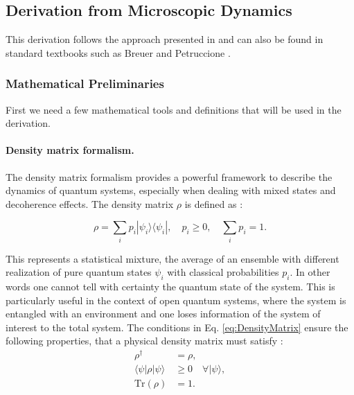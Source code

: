 \subsection{Derivation from Microscopic Dynamics}
\label{subsec:Derivation_redfield_eq}

\noindent
This derivation follows the approach presented in \cite{manzano2020shortintroductionlindblad} and can also be found in standard textbooks such as Breuer and Petruccione \cite{breuerpetruccione2009theoryopenquantum}. 

\subsubsection{Mathematical Preliminaries}
\label{subsubsec:preliminaries_tools}

\noindent
First we need a few mathematical tools and definitions that will be used in the derivation.


\paragraph{Density matrix formalism.}

The density matrix formalism provides a powerful framework to describe the dynamics of quantum systems, especially when dealing with mixed states and decoherence effects.
The density matrix \(\rho\) is defined as \cite{campaiolietal2024quantummasterequations}:

\begin{equation}
	\rho = \sum_i p_i |\psi_i\rangle \langle \psi_i|, \quad p_i \geq 0, \quad \sum_i p_i = 1.
	\label{eq:DensityMatrix}
\end{equation}


\noindent
This represents a statistical mixture, the average of an ensemble with different realization of pure quantum states $\psi_i $ with classical probabilities $ p_i $. In other words one cannot tell with certainty the quantum state of the system. This is particularly useful in the context of open quantum systems, where the system is entangled with an environment and one loses information of the system of interest to the total system.
The conditions in Eq. \eqref{eq:DensityMatrix} ensure the following properties, that a physical density matrix must satisfy :
\begin{align}
	\label{eq:physical_dms}
	\rho^\dagger &= \rho, \\
	\langle \psi | \rho | \psi \rangle &\geq 0 \quad \forall |\psi\rangle, \\
	\mathrm{Tr}(\rho) &= 1. 
\end{align}

